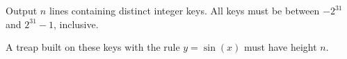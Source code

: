 Output $n$ lines containing distinct integer keys. All keys must be between $-2^{31}$ and $2^{31} - 1$, inclusive.

A treap built on these keys with the rule $y = \sin(x)$ must have height $n$.